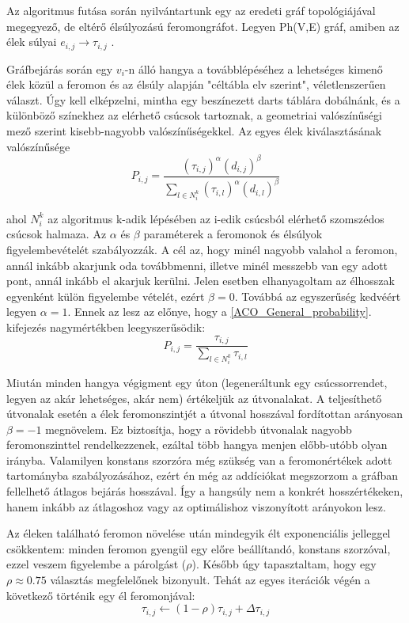 Az algoritmus futása során nyilvántartunk egy az eredeti gráf topológiájával megegyező, de eltérő élsúlyozású feromongráfot. Legyen Ph(V,E) gráf, amiben az élek súlyai \( e_{i,j} \rightarrow \tau_{i,j} \) .

Gráfbejárás során egy \(v_i\)-n álló hangya a továbblépéséhez a lehetséges kimenő élek közül a feromon és az élsúly alapján "céltábla elv szerint", véletlenszerűen választ. Úgy kell elképzelni, mintha egy beszínezett darts táblára dobálnánk, és a különböző színekhez az elérhető csúcsok tartoznak, a geometriai valószínűségi mező szerint kisebb-nagyobb valószínűségekkel. Az egyes élek kiválasztásának valószínűsége
\begin{equation}
	P_{i,j} = \frac{(\tau_{i,j})^\alpha(d_{i,j})^\beta}{\sum_{l \in N_i^k}(\tau_{i,l})^\alpha(d_{i,l})^\beta }
	\label{ACO_General_probability}
\end{equation}


ahol \(N_i^k \) az algoritmus k-adik lépésében az i-edik csúcsból elérhető szomszédos csúcsok halmaza. Az \(\alpha\) és \(\beta\) paraméterek a feromonok és élsúlyok figyelembevételét szabályozzák. A cél az, hogy minél nagyobb valahol a feromon, annál inkább akarjunk oda továbbmenni, illetve minél messzebb van egy adott pont, annál inkább el akarjuk kerülni. Jelen esetben elhanyagoltam az élhosszak egyenként külön figyelembe vételét, ezért \(\beta = 0\). Továbbá az egyszerűség kedvéért legyen \(\alpha = 1\). Ennek az lesz az előnye, hogy a \ref{ACO_General_probability}. kifejezés nagymértékben leegyszerűsödik:
\begin{equation}
	P_{i,j} = \frac{\tau_{i,j}}{\sum_{l \in N_i^k}\tau_{i,l}}
	\label{ACO_My_probability}
\end{equation}

Miután minden hangya végigment egy úton (legeneráltunk egy csúcssorrendet, legyen az akár lehetséges, akár nem) értékeljük az útvonalakat. A teljesíthető útvonalak esetén a élek feromonszintjét a útvonal hosszával fordítottan arányosan \(\beta = -1\) megnövelem. Ez biztosítja, hogy a rövidebb útvonalak nagyobb feromonszinttel rendelkezzenek, ezáltal több hangya menjen előbb-utóbb olyan irányba. Valamilyen konstans szorzóra még szükség van a feromonértékek adott tartományba szabályozásához, ezért én még az addíciókat megszorzom a gráfban fellelhető átlagos bejárás hosszával. Így a hangsúly nem a konkrét hosszértékeken, hanem inkább az átlagoshoz vagy az optimálishoz viszonyított arányokon lesz.

Az éleken található feromon növelése után mindegyik élt exponenciális jelleggel csökkentem: minden feromon gyengül egy előre beállítandó, konstans szorzóval, ezzel veszem figyelembe a párolgást (\(\rho\)). Később úgy tapasztaltam, hogy egy \(\rho \approx 0.75\) választás megfelelőnek bizonyult. Tehát az egyes iterációk végén a következő történik egy él feromonjával:
\[ \tau_{i,j} \leftarrow (1-\rho)\tau_{i,j} + \Delta\tau_{i,j} \]

